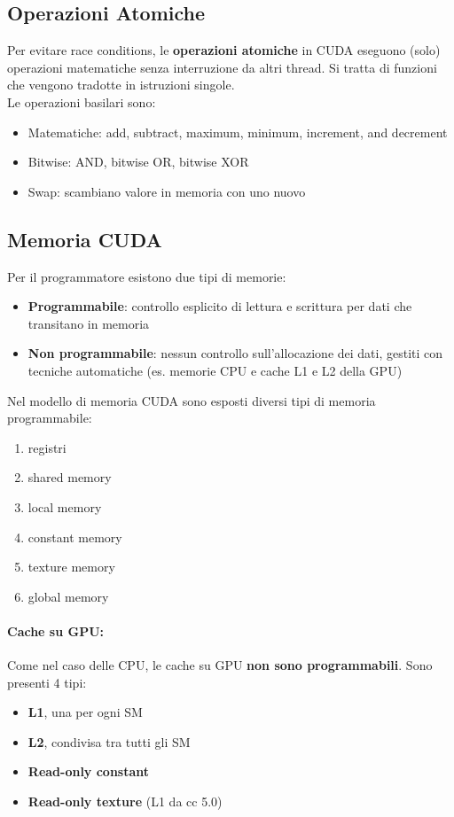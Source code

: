\subsection{Operazioni Atomiche}

Per evitare race conditions, le \textbf{operazioni atomiche} in CUDA eseguono (solo) operazioni matematiche senza interruzione da altri thread. Si tratta di funzioni che vengono tradotte in istruzioni singole. \\

Le operazioni basilari sono:
\begin{itemize}
	\item Matematiche: add, subtract, maximum, minimum, increment, and decrement
	\item Bitwise: AND, bitwise OR, bitwise XOR
	\item Swap: scambiano valore in memoria con uno nuovo
\end{itemize}

\newpage

\subsection{Memoria CUDA}

Per il programmatore esistono due tipi di memorie: 
\begin{itemize}
	\item \textbf{Programmabile}: controllo esplicito di lettura e scrittura per dati che transitano in memoria
	\item \textbf{Non programmabile}: nessun controllo sull'allocazione dei dati, gestiti con tecniche automatiche (es. memorie CPU e cache L1 e L2 della GPU)
\end{itemize}

Nel modello di memoria CUDA sono esposti diversi tipi di memoria programmabile: 
\begin{enumerate}
	\item registri
	\item shared memory
	\item local memory
	\item constant memory
	\item texture memory
	\item global memory
\end{enumerate}

\paragraph{Cache su GPU:} Come nel caso delle CPU, le cache su GPU \textbf{non sono programmabili}. Sono presenti 4 tipi:
\begin{itemize}
	\item \textbf{L1}, una per ogni SM
	\item \textbf{L2}, condivisa tra tutti gli SM
	\item \textbf{Read-only constant}
	\item \textbf{Read-only texture} (L1 da cc 5.0)
\end{itemize}


